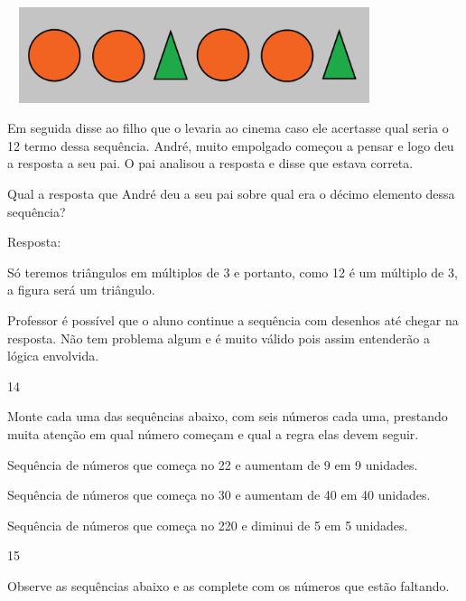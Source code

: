 \includegraphics[width=4.30871in,height=1.10010in]{media/image36.png}

Em seguida disse ao filho que o levaria ao cinema caso ele acertasse
qual seria o 12 termo dessa sequência. André, muito empolgado começou a
pensar e logo deu a resposta a seu pai. O pai analisou a resposta e
disse que estava correta.

Qual a resposta que André deu a seu pai sobre qual era o décimo elemento
dessa sequência?


Resposta:

Só teremos triângulos em múltiplos de 3 e portanto, como 12 é um
múltiplo de 3, a figura será um triângulo.

Professor é possível que o aluno continue a sequência com desenhos até
chegar na resposta. Não tem problema algum e é muito válido pois assim
entenderão a lógica envolvida.

\num{14}

Monte cada uma das sequências abaixo, com seis números cada uma,
prestando muita atenção em qual número começam e qual a regra elas devem
seguir.

\begin{escolha}

  \item
  Sequência de números que começa no 22 e aumentam de 9 em 9 unidades.

\item
  Sequência de números que começa no 30 e aumentam de 40 em 40 unidades.

\item
  Sequência de números que começa no 220 e diminui de 5 em 5 unidades.
\end{escolha}

\num{15}

Observe as sequências abaixo e as complete com os números que estão
faltando.

\begin{escolha}

\item
\end{escolha}

